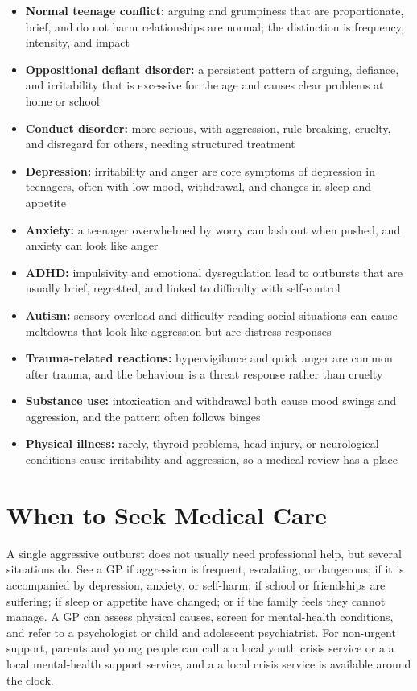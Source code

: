 \begin{itemize}
    \item \textbf{Normal teenage conflict:} arguing and grumpiness that are proportionate, brief, and do not harm relationships are normal; the distinction is frequency, intensity, and impact
    \item \textbf{Oppositional defiant disorder:} a persistent pattern of arguing, defiance, and irritability that is excessive for the age and causes clear problems at home or school
    \item \textbf{Conduct disorder:} more serious, with aggression, rule-breaking, cruelty, and disregard for others, needing structured treatment
    \item \textbf{Depression:} irritability and anger are core symptoms of depression in teenagers, often with low mood, withdrawal, and changes in sleep and appetite
    \item \textbf{Anxiety:} a teenager overwhelmed by worry can lash out when pushed, and anxiety can look like anger
    \item \textbf{ADHD:} impulsivity and emotional dysregulation lead to outbursts that are usually brief, regretted, and linked to difficulty with self-control
    \item \textbf{Autism:} sensory overload and difficulty reading social situations can cause meltdowns that look like aggression but are distress responses
    \item \textbf{Trauma-related reactions:} hypervigilance and quick anger are common after trauma, and the behaviour is a threat response rather than cruelty
    \item \textbf{Substance use:} intoxication and withdrawal both cause mood swings and aggression, and the pattern often follows binges
    \item \textbf{Physical illness:} rarely, thyroid problems, head injury, or neurological conditions cause irritability and aggression, so a medical review has a place
\end{itemize}

\section*{When to Seek Medical Care}
A single aggressive outburst does not usually need professional help, but several situations do. See a GP if aggression is frequent, escalating, or dangerous; if it is accompanied by depression, anxiety, or self-harm; if school or friendships are suffering; if sleep or appetite have changed; or if the family feels they cannot manage. A GP can assess physical causes, screen for mental-health conditions, and refer to a psychologist or child and adolescent psychiatrist. For non-urgent support, parents and young people can call a a local youth crisis service or a a local mental-health support service, and a a local crisis service is available around the clock.

